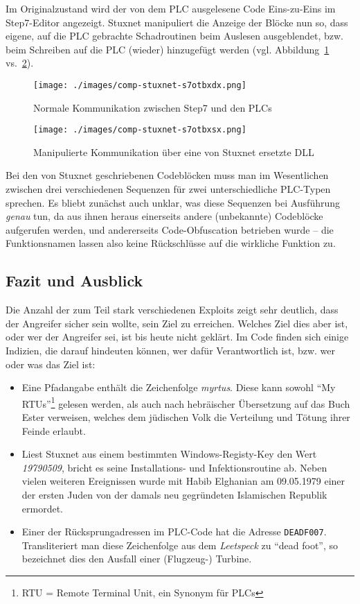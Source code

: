 Im Originalzustand wird der von dem PLC ausgelesene Code Eins-zu-Eins
im Step7-Editor angezeigt. Stuxnet manipuliert die Anzeige der Blöcke
nun so, dass eigene, auf die PLC gebrachte Schadroutinen beim Auslesen
ausgeblendet, bzw.  beim Schreiben auf die PLC (wieder) hinzugefügt
werden (vgl.  Abbildung~\ref{fig:comp:stuxnet:s7otbxdx}
vs.~\ref{fig:comp:stuxnet:s7otbxsx}).

\begin{figure}[p]
  \centering
  \texttt{[image: ./images/comp-stuxnet-s7otbxdx.png]}
  \caption{Normale Kommunikation zwischen Step7 und den PLCs}
  \label{fig:comp:stuxnet:s7otbxdx}
\end{figure}

\begin{figure}[p]
  \centering
  \texttt{[image: ./images/comp-stuxnet-s7otbxsx.png]}
  \caption{Manipulierte Kommunikation über eine von Stuxnet ersetzte DLL}
  \label{fig:comp:stuxnet:s7otbxsx}
\end{figure}



Bei den von Stuxnet geschriebenen Codeblöcken muss man im Wesentlichen
zwischen drei verschiedenen Sequenzen für zwei unterschiedliche
PLC-Typen sprechen. Es bliebt zunächst auch unklar, was diese
Sequenzen bei Ausführung \emph{genau} tun, da aus ihnen heraus
einerseits andere (unbekannte) Codeblöcke aufgerufen werden, und
andererseits Code-Obfuscation betrieben wurde -- die Funktionsnamen
lassen also keine Rückschlüsse auf die wirkliche Funktion zu.

\subsection{Fazit und Ausblick}

Die Anzahl der zum Teil stark verschiedenen Exploits zeigt sehr
deutlich, dass der Angreifer sicher sein wollte, sein Ziel zu
erreichen. Welches Ziel dies aber ist, oder wer der Angreifer sei, ist
bis heute nicht geklärt. Im Code finden sich einige Indizien, die
darauf hindeuten können, wer dafür Verantwortlich ist, bzw. wer oder
was das Ziel ist:

\begin{itemize}
  \item Eine Pfadangabe enthält die Zeichenfolge \emph{myrtus}. Diese
kann sowohl \enquote{My RTUs}\footnote{RTU = Remote Terminal Unit, ein
Synonym für PLCs} gelesen werden, als auch nach hebräischer
Übersetzung auf das Buch Ester verweisen, welches dem jüdischen Volk
die Verteilung und Tötung ihrer Feinde erlaubt.
  \item Liest Stuxnet aus einem bestimmten Windows-Registy-Key den
Wert \emph{19790509}, bricht es seine Installations- und
Infektionsroutine ab.  Neben vielen weiteren Ereignissen wurde mit
Habib Elghanian am 09.05.1979 einer der ersten Juden von der damals
neu gegründeten Islamischen Republik ermordet.
  \item Einer der Rücksprungadressen im PLC-Code hat die Adresse
\texttt{DEADF007}. Transliteriert man diese Zeichenfolge aus dem
\textit{Leetspeck} zu \enquote{dead foot}, so bezeichnet dies den
Ausfall einer (Flugzeug-) Turbine.
\end{itemize}

